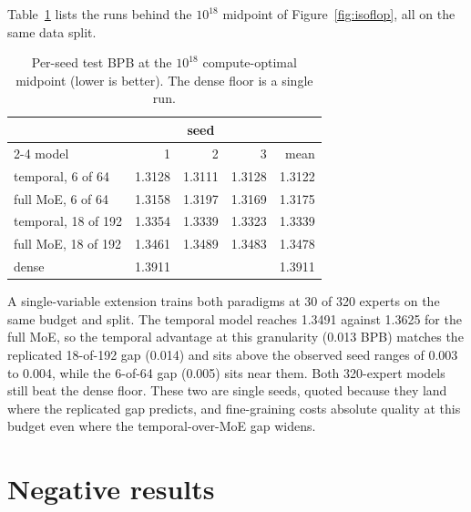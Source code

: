 \documentclass{article}
\begin{document}
Table~\ref{tab:seeds} lists the runs behind the $10^{18}$ midpoint of
Figure~\ref{fig:isoflop}, all on the same data split.

\begin{table}[h]
  \centering\small
  \caption{Per-seed test BPB at the $10^{18}$ compute-optimal midpoint (lower is better).
  The dense floor is a single run.}
  \label{tab:seeds}
  \vspace{4pt}
  \begin{tabular}{@{}lrrrr@{}}
    \toprule
    & \multicolumn{3}{c}{seed} & \\
    \cmidrule(lr){2-4}
    model & 1 & 2 & 3 & mean \\
    \midrule
    temporal, 6 of 64   & 1.3128 & 1.3111 & 1.3128 & 1.3122 \\
    full MoE, 6 of 64   & 1.3158 & 1.3197 & 1.3169 & 1.3175 \\
    temporal, 18 of 192 & 1.3354 & 1.3339 & 1.3323 & 1.3339 \\
    full MoE, 18 of 192 & 1.3461 & 1.3489 & 1.3483 & 1.3478 \\
    dense               & 1.3911 &        &        & 1.3911 \\
    \bottomrule
  \end{tabular}
\end{table}

A single-variable extension trains both paradigms at 30 of 320 experts on the same budget
and split. The temporal model reaches 1.3491 against 1.3625 for the full MoE, so the
temporal advantage at this granularity (0.013 BPB) matches the replicated 18-of-192 gap
(0.014) and sits above the observed seed ranges of 0.003 to 0.004, while the 6-of-64 gap
(0.005) sits near them. Both 320-expert models still beat the dense floor. These two
are single seeds, quoted because they land where the replicated gap predicts, and
fine-graining costs absolute quality at this budget even where the temporal-over-MoE gap
widens.

\section{Negative results}\label{app:negatives}
\end{document}
